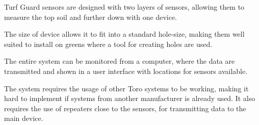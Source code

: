 Turf Guard\texttrademark{} sensors are designed with two layers of sensors, allowing them to measure the top soil and further down with one device.

The size of device allows it to fit into a standard hole-size, making them well suited to install on greens where a tool for creating holes are used\cite{turfGuard2}.

The entire system can be monitored from a computer, where the data are transmitted and shown in a user interface with locations for sensors available\cite{turfGuard2}.

The system requires the usage of other Toro systems to be working, making it hard to implement if systems from another manufacturer is already used. It also requires the use of repeaters close to the sensors, for transmitting data to the main device\cite{turfGuard2}.
